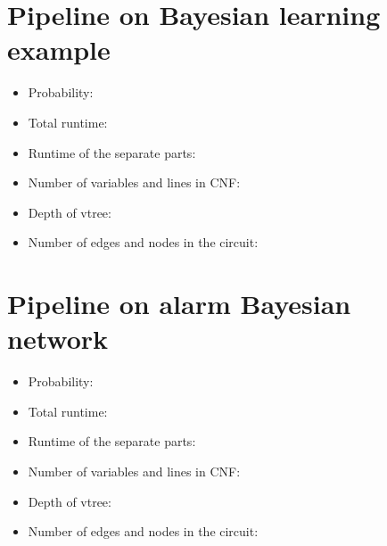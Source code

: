 \section{Pipeline on Bayesian learning example}
\begin{itemize}
    \item Probability:
    \item Total runtime:
    \item Runtime of the separate parts:
    \item Number of variables and lines in CNF:
    \item Depth of vtree:
    \item Number of edges and nodes in the circuit:
\end{itemize}

\section{Pipeline on alarm Bayesian network}
\begin{itemize}
    \item Probability:
    \item Total runtime:
    \item Runtime of the separate parts:
    \item Number of variables and lines in CNF:
    \item Depth of vtree:
    \item Number of edges and nodes in the circuit:
\end{itemize}